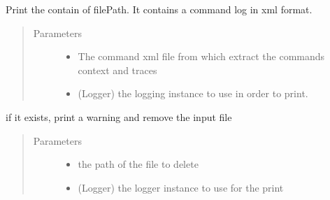 \documentclass[a4paper,10pt,english]{sphinxmanual}
\begin{document}

\begin{fulllineitems}
\label{\detokenize{apidoc_commands/commands:commands.log.print_log_command_in_terminal}}
Print the contain of filePath. It contains a command log in xml format.
\begin{quote}\begin{description}
\item[{Parameters}] \leavevmode\begin{itemize}
\item {} 
 \textendash{} The command xml file from which extract the commands context and traces

\item {} 
 \textendash{} (Logger) the logging instance to use in order to print.

\end{itemize}

\end{description}\end{quote}

\end{fulllineitems}


\begin{fulllineitems}
\label{\detokenize{apidoc_commands/commands:commands.log.remove_log_file}}
if it exists, print a warning and remove the input file
\begin{quote}\begin{description}
\item[{Parameters}] \leavevmode\begin{itemize}
\item {} 
 \textendash{} the path of the file to delete

\item {} 
 \textendash{} (Logger) the logger instance to use for the print

\end{itemize}

\end{description}\end{quote}

\end{fulllineitems}
\end{document}
